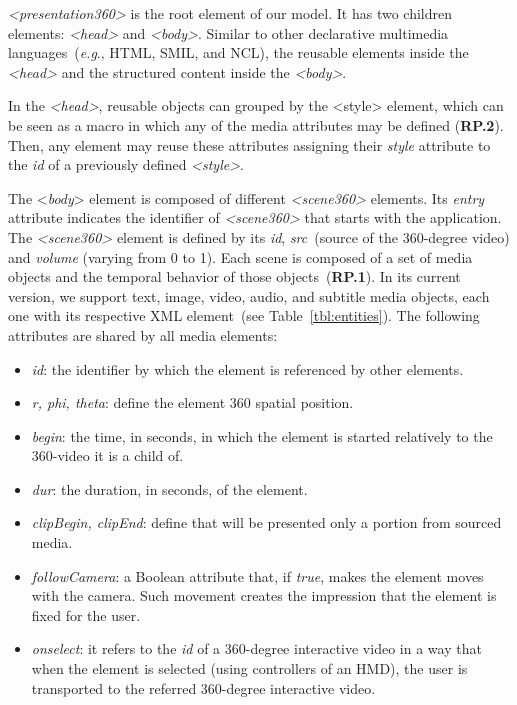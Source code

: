 \emph{<presentation360>} is the root element of our model.
It has two children elements: \emph{<head>} and \emph{<body>}.
Similar to other declarative multimedia languages~(\emph{e.g}., HTML, SMIL,
and NCL), the reusable elements inside the \emph{<head>} and the structured
content inside the \emph{<body>}.

In the \emph{<head>},  reusable objects can grouped by the <style> element,
which can be seen as a macro in which any of the media attributes may be
defined (\textbf{RP.2}).
Then, any element may reuse these attributes assigning their \emph{style}
attribute to the \emph{id} of a previously defined \emph{<style>}.

The <\emph{body}> element is composed of different \emph{\emph{<scene360>}}
elements.
Its \emph{entry} attribute indicates the identifier of \textit{<scene360>} that
starts with the application.
The \emph{<scene360>} element is defined by its \emph{id}, \emph{src}~(source
of the 360-degree video) and \emph{volume} (varying from 0 to 1). 
Each scene is composed of a set of media objects and the temporal behavior of
those objects~(\textbf{RP.1}).
In its current version, we support text, image, video, audio, and
subtitle media objects, each one with its respective XML element~(see
Table~\ref{tbl:entities}).
The following attributes are shared by all media elements:

\begin{itemize}
  \item \emph{id}: the identifier by which the element is referenced by
    other elements.
  \item \emph{r, phi, theta}: define the element 360 spatial position.
  \item \emph{begin}: the time, in seconds, in which the element is started
    relatively to the 360-video it is a child of.
  \item \emph{dur}: the duration, in seconds, of the element.
  \item \emph{clipBegin, clipEnd}: define that will be presented only a
    portion from sourced media.
  \item \emph{followCamera}: a Boolean attribute that, if \emph{true}, makes
    the element moves with the camera. Such movement creates the impression
    that the element is fixed for the user.
  \item \emph{onselect}: it refers to the \emph{id} of a 360-degree
    interactive video in a way that when the element is selected (using
    controllers of an HMD), the user is transported to the referred 360-degree
    interactive video.
\end{itemize}

